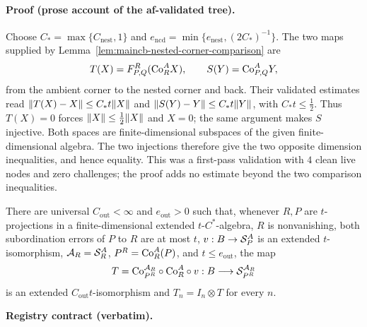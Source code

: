 \paragraph{Proof (prose account of the af-validated tree).}
Choose $C_* =\max\{C_{\mathrm{nest}},1\}$ and
$e_{\mathrm{ncd}}=\min\{e_{\mathrm{nest}},(2C_*)^{-1}\}$. The two maps supplied by
Lemma~\ref{lem:maincb-nested-corner-comparison} are
\[
 T(X)=F^R_{P,Q}(\mathrm{Co}_{R}^A X),\qquad S(Y)=\mathrm{Co}_{P,Q}^A Y,
\]
from the ambient corner to the nested corner and back. Their validated estimates read
$\lVert T(X)-X\rVert\le C_*t\lVert X\rVert$ and $\lVert S(Y)-Y\rVert\le C_*t\lVert Y\rVert$, with
$C_*t\le\tfrac12$. Thus $T(X)=0$ forces $\lVert X\rVert\le\tfrac12\lVert X\rVert$ and $X=0$;
the same argument makes $S$ injective. Both spaces are finite-dimensional subspaces
of the given finite-dimensional algebra. The two injections therefore give the two
opposite dimension inequalities, and hence equality. This was a first-pass validation
with $4$ clean live nodes and zero challenges; the proof adds no estimate beyond the
two comparison inequalities.

\begin{lemma}\label{lem:maincb-outer-compression-transfer}
There are universal $C_{\mathrm{out}}<\infty$ and $e_{\mathrm{out}}>0$ such that,
whenever $R,P$ are $t$-projections in a finite-dimensional extended $t$-$C^*$-algebra,
$R$ is nonvanishing, both subordination errors of $P$ to $R$ are at most $t$,
$v:B\to\mathcal S_{P}^A$ is an extended $t$-isomorphism,
$\mathcal A_R=\mathcal S_{R}^A$, $P^R=\mathrm{Co}_{R}^A(P)$, and $t\le e_{\mathrm{out}}$, the map
\[
 T=\mathrm{Co}_{P^R}^{\mathcal A_R}\circ\mathrm{Co}_{R}^A\circ v:
 B\longrightarrow\mathcal S_{P^R}^{\mathcal A_R}
\]
is an extended $C_{\mathrm{out}}t$-isomorphism and $T_n=I_n\otimes T$ for every $n$.
\end{lemma}
\noindent\textbf{Registry contract (verbatim).}

